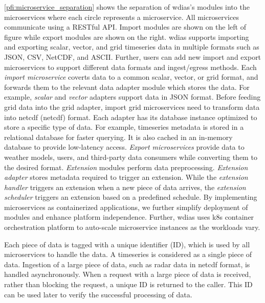 \documentclass[conference]{IEEEtran}
\begin{document}
\cref{pfi:microservice_separation} shows the separation of \acrshort{wdias}'s modules into the microservices where each circle represents a microservice. All microservices communicate using a RESTful API. Import modules are shown on the left of figure while export modules are shown on the right. \acrshort{wdias} supports importing
and exporting scalar, vector, and grid timeseries data in multiple formats such as JSON, CSV, NetCDF, and ASCII.
Further, users can add new import and export microservices to support different data formats and ingest/egress methods. Each \emph{import microservice} coverts data to a common scalar, vector, or grid format, and forwards them to the relevant data adapter module which stores the data. For example, \emph{scalar} and \emph{vector} adapters support data in JSON format. Before feeding grid data into the grid adapter, import grid microservices need to transform data into \acrlong{netcdf} (\acrshort{netcdf}) format. Each adapter has its database instance optimized to store a specific type of data. For example, timeseries metadata is stored in a relational database for faster querying. It is also cached in an in-memory database to provide low-latency access. \emph{Export microservices} provide data to weather models, users, and third-party data consumers while converting them to the desired format. \emph{Extension} modules perform data preprocessing. \emph{Extension adapter} stores metadata required to trigger an extension. While the \emph{extension handler} triggers an extension when a new piece of data arrives, the \emph{extension scheduler} triggers an extension based on a predefined schedule. By implementing microservices as containerized applications, we further simplify deployment of modules and enhance platform independence. Further, \acrshort{wdias} uses \acrfull{k8s} \cite{LinuxFoundationProduction-GradeKubernetes} container orchestration platform to auto-scale microservice instances as the workloads vary.


Each piece of data is tagged with a unique identifier (ID), which is used by all microservices to handle the data. A timeseries is considered as a single piece of data. Ingestion of a large piece of data, such as radar data in \acrshort{netcdf} format, is handled asynchronously. When a request with a large piece of data is received, rather than blocking the request, a unique ID is returned to the caller. This ID can be used later to verify the successful processing of data.
\end{document}
